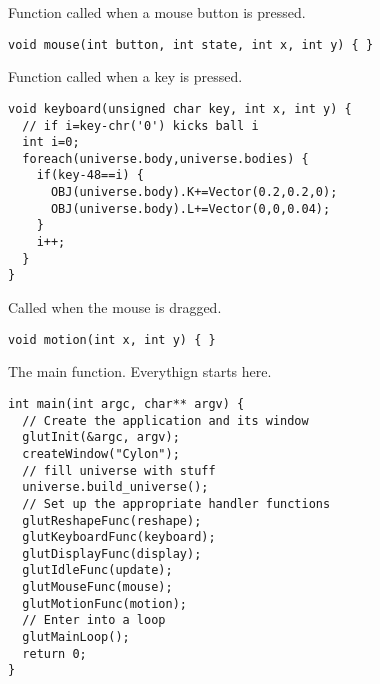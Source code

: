 Function called when a mouse button is pressed.
\begin{lstlisting}
void mouse(int button, int state, int x, int y) { }
\end{lstlisting}

Function called when a key is pressed.
\begin{lstlisting}
void keyboard(unsigned char key, int x, int y) {
  // if i=key-chr('0') kicks ball i
  int i=0;
  foreach(universe.body,universe.bodies) {
    if(key-48==i) {    
      OBJ(universe.body).K+=Vector(0.2,0.2,0);
      OBJ(universe.body).L+=Vector(0,0,0.04);
    }
    i++;
  }
}
\end{lstlisting}

Called when the mouse is dragged.
\begin{lstlisting}
void motion(int x, int y) { }
\end{lstlisting}

The main function. Everythign starts here.
\begin{lstlisting}
int main(int argc, char** argv) {
  // Create the application and its window
  glutInit(&argc, argv);
  createWindow("Cylon");
  // fill universe with stuff
  universe.build_universe();
  // Set up the appropriate handler functions
  glutReshapeFunc(reshape);
  glutKeyboardFunc(keyboard);
  glutDisplayFunc(display);
  glutIdleFunc(update);
  glutMouseFunc(mouse);
  glutMotionFunc(motion);  
  // Enter into a loop
  glutMainLoop();  
  return 0;
}
\end{lstlisting}
